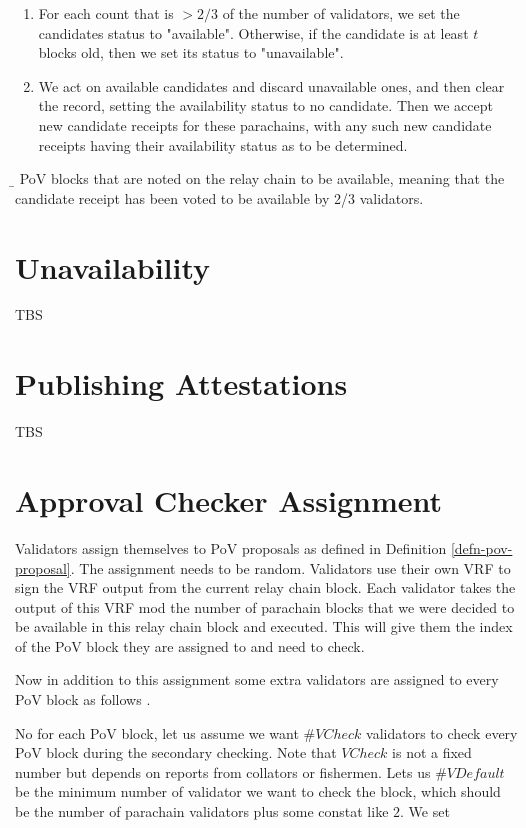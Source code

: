 {\begin{enumerate}
\item For each count that is $>2/3$ of the number of validators, we set the candidates status to "available". Otherwise, if the candidate is at least $t$ blocks old, then we set its status to "unavailable".

\item We act on available candidates and discard unavailable ones, and then clear the record, setting the availability status to no candidate. Then we accept new candidate receipts for these parachains, with any such new candidate receipts having their availability status as to be determined.
\end{enumerate}

\begin{definition}
  \label{defn-available-pov-proposal}
        {\b }
        PoV blocks that are noted on the relay chain to be available, meaning that the candidate receipt has been voted to be available by 2/3 validators.
\end{definition}

\section{Unavailability}
\label{sect-unavailability}
TBS

\section{Publishing Attestations}
\label{sect-publishing-attestations}
TBS 

\section{Approval Checker Assignment}
\label{sect-shot-assignment}

Validators assign themselves to PoV proposals as defined in Definition \ref{defn-pov-proposal}. The assignment needs to be random. Validators use their own VRF to sign the VRF output from the current relay chain block. Each validator takes the output of this VRF mod the number of parachain blocks that we were decided to be available in this relay chain block and executed. This will give them the index of the PoV block they are assigned to and need to check.

Now in addition to this assignment some extra validators are assigned to every PoV block as follows .

No for each PoV block, let us assume we want $\#VCheck$ validators to check every PoV block during the secondary checking. Note that $VCheck$ is not a fixed number but depends on reports from collators or fishermen. Lets us $\#VDefault$ be the minimum number of validator we want to check the block, which should be the number of parachain validators plus some constat like $2$.  We set

}
